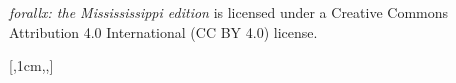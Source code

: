 \documentclass[bleedwidth=3.17mm, marklength=0mm, coverheight=228.6mm, coverwidth=152.4mm, spinewidth=14.05mm]{bookcover} %
\begin{document}
\begin{bookcover}
{\quad \textit{forallx: the Missississippi edition} is licensed under a Creative Commons Attribution 4.0 International (CC BY 4.0) license.  
}


[,1cm,,]{
\vfill
\centering\textcolor{forallx-orange}{
\colorbox{white}{%
}}}


\end{bookcover}
\end{document}
